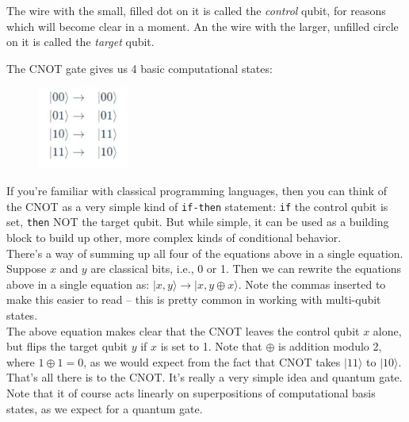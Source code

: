 \documentclass{article}
\newcommand{\code}[1]{\colorbox{light-gray}{\texttt{#1}}}
\begin{document}
The wire with the small, filled dot on it is called the \textit{control} qubit,
for reasons which will become clear in a moment. An the wire with the larger,
unfilled circle on it is called the \textit{target} qubit.

The CNOT gate gives us 4 basic computational states:

\begin{figure}[h]
    \includegraphics[width=3cm]{5.jpg}
    \centering
\end{figure}

If you're familiar with classical programming languages, then you can think of
the CNOT as a very simple kind of \code{if-then} statement: \code{if} the
control qubit is set, \code{then} NOT the target qubit. But while simple, it
can be used as a building block to build up other, more complex kinds of
conditional behavior.\\
There's a way of summing up all four of the equations above in a single
equation. Suppose $x$ and $y$ are classical bits, i.e., 0 or 1. Then we can
rewrite the equations above in a single equation as: $|x,y\rangle\rightarrow |x,y\oplus x\rangle$.
Note the commas inserted to make this easier to read -- this is pretty common
in working with multi-qubit states. \\
The above equation makes clear that the CNOT leaves the control qubit $x$ alone,
but flips the target qubit $y$ if $x$ is set to 1. Note that $\oplus$ is addition
modulo 2, where $1 \oplus 1 = 0$, as we would expect from the fact that CNOT
takes $|11\rangle$ to $|10\rangle$.\\
That's all there is to the CNOT. It's really a very simple idea and quantum
gate. Note that it of course acts linearly on superpositions of computational
basis states, as we expect for a quantum gate.

\end{document}
